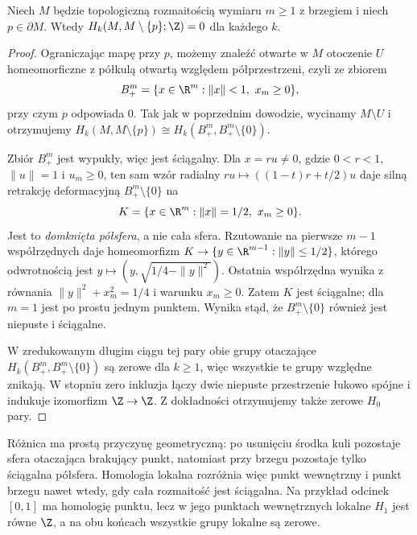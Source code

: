 \begin{stwierdzenie}
\label{prop:lokalna-homologia-brzeg-8}
Niech $M$ będzie topologiczną rozmaitością wymiaru $m\geq1$
z brzegiem i niech $p\in\partial M$.
Wtedy $H_k(M,M\setminus\{p\};\Z)=0$ dla każdego $k$.
\end{stwierdzenie}
\begin{proof}
Ograniczając mapę przy $p$, możemy znaleźć otwarte w $M$
otoczenie $U$ homeomorficzne z półkulą otwartą względem
półprzestrzeni, czyli ze zbiorem
\[
 B_+^m=\{x\in\R^m:\|x\|<1,\ x_m\geq0\},
\]
przy czym $p$ odpowiada $0$. Tak jak w poprzednim dowodzie,
wycinamy $M\setminus U$ i otrzymujemy
$H_k(M,M\setminus\{p\})\cong H_k(B_+^m,B_+^m\setminus\{0\})$.

Zbiór $B_+^m$ jest wypukły, więc jest ściągalny.
Dla $x=ru\ne0$, gdzie $0<r<1$, $\|u\|=1$ i $u_m\geq0$,
ten sam wzór radialny
$ru\mapsto((1-t)r+t/2)u$ daje silną retrakcję deformacyjną
$B_+^m\setminus\{0\}$ na
\[
 K=\{x\in\R^m:\|x\|=1/2,\ x_m\geq0\}.
\]
Jest to \emph{domknięta półsfera}, a nie cała sfera.
Rzutowanie na pierwsze $m-1$ współrzędnych daje homeomorfizm
$K\to\{y\in\R^{m-1}:\|y\|\leq1/2\}$,
którego odwrotnością jest
$y\mapsto(y,\sqrt{1/4-\|y\|^2})$.
Ostatnia współrzędna wynika z równania
$\|y\|^2+x_m^2=1/4$ i warunku $x_m\geq0$.
Zatem $K$ jest ściągalne; dla $m=1$ jest po prostu jednym punktem.
Wynika stąd, że $B_+^m\setminus\{0\}$ również jest niepuste
i ściągalne.

W zredukowanym długim ciągu tej pary obie grupy otaczające
$H_k(B_+^m,B_+^m\setminus\{0\})$ są zerowe dla $k\geq1$,
więc wszystkie te grupy względne znikają.
W stopniu zero inkluzja łączy dwie niepuste przestrzenie
łukowo spójne i indukuje izomorfizm $\Z\to\Z$.
Z dokładności otrzymujemy także zerowe $H_0$ pary.
\end{proof}

Różnica ma prostą przyczynę geometryczną: po usunięciu
środka kuli pozostaje sfera otaczająca brakujący punkt,
natomiast przy brzegu pozostaje tylko ściągalna półsfera.
Homologia lokalna rozróżnia więc punkt wewnętrzny i punkt
brzegu nawet wtedy, gdy cała rozmaitość jest ściągalna.
Na przykład odcinek $[0,1]$ ma homologię punktu,
lecz w jego punktach wewnętrznych lokalne $H_1$ jest równe $\Z$,
a na obu końcach wszystkie grupy lokalne są zerowe.

